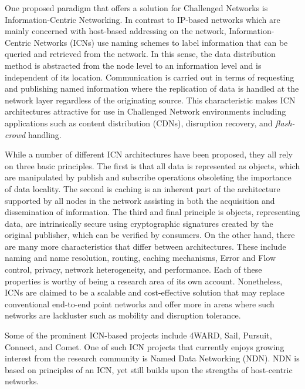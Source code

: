 \documentclass[a4paper,12pt]{report}      %
\begin{document}
One proposed paradigm that offers a solution for Challenged Networks is Information-Centric
Networking. In contrast to IP-based networks which are mainly concerned with host-based
addressing on the network, Information-Centric Networks (ICNs) use naming schemes to label
information that can be queried and retrieved from the network. In this sense, the data distribution
method is abstracted from the node level to an information level and is independent of its location.
Communication is carried out in terms of requesting and publishing named information where the
replication of data is handled at the network layer regardless of the originating source. This
characteristic makes ICN architectures attractive for use in Challenged Network environments
including applications such as content distribution (CDNs), disruption recovery, and \emph{flash-crowd}
handling.

While a number of different ICN architectures have been proposed, they all rely on three basic
principles. The first is that all data is represented as objects, which are manipulated by publish and
subscribe operations obsoleting the importance of data locality. The second is caching is an inherent
part of the architecture supported by all nodes in the network assisting in both the acquisition and
dissemination of information. The third and final principle is objects, representing data, are intrinsically
secure using cryptographic signatures created by the original publisher, which can be verified
by consumers. On the other hand, there are many more characteristics that differ between architectures.
These include naming and name resolution, routing, caching mechanisms, Error and Flow control,
privacy, network heterogeneity, and performance. Each of these properties is worthy of being a research
area of its own account\cite{hotnets}. Nonetheless, ICNs are claimed to be a scalable and
cost-effective solution that may replace conventional end-to-end point networks and offer more in areas 
where such networks are lackluster such as mobility and disruption tolerance.

Some of the prominent ICN-based projects include 4WARD, Sail, Pursuit, Connect, and Comet\cite{bond}. 
One of such ICN projects that currently enjoys growing interest from the research
community is Named Data Networking (NDN). NDN is based on principles of an ICN, yet still builds
upon the strengths of host-centric networks\cite{ndnproj}. 
\end{document}
